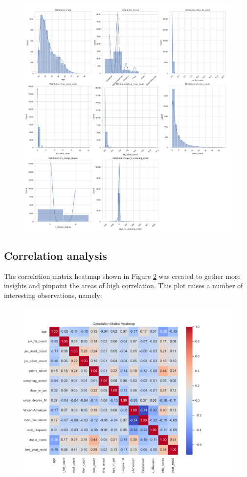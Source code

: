 \begin{figure}[H]
	\centering
	\includegraphics[width=0.9\linewidth]{img/distribution-plots}
	\caption{}
	\label{fig:distribution-plots}
\end{figure}


\subsection{Correlation analysis}

The correlation matrix heatmap shown in Figure \ref{fig:correlationmatrixheatmap} was created to gather more insights and pinpoint the areas of high correlation. This plot raises a number of interesting observations, namely:

\begin{figure}[!h]
	\centering
	\includegraphics[width=0.7\linewidth]{img/correlation_matrix_heatmap}
	\caption{}
	\label{fig:correlationmatrixheatmap}
\end{figure}


